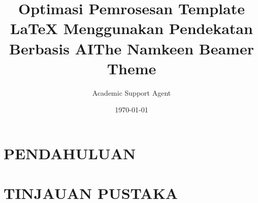 \documentclass{beamer}
\title{Optimasi Pemrosesan Template LaTeX Menggunakan Pendekatan Berbasis AI}
\author{Academic Support Agent}
\date{\today}
\begin{document}
\maketitle

\begin{abstract}

\end{abstract}

\chapter{PENDAHULUAN}


\chapter{TINJAUAN PUSTAKA}


  

\usepackage[utf8]{inputenc}
\usepackage[english]{babel}
\usepackage[T1]{fontenc}
\usepackage{helvet}


\newcommand{\chref}[2]{%
  \href{#1}{{\usebeamercolor[bg]{Namkeen}#2}}%
}

\title[The Namkeen Beamer Theme]%
{The Namkeen Beamer Theme}
\end{document}
